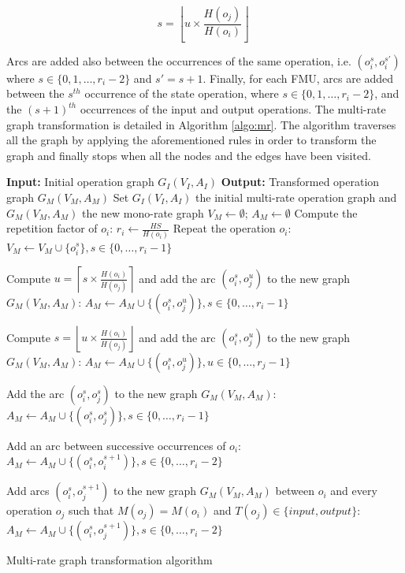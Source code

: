 \begin{equation}
s = \left \lfloor{u \times \frac{H(o_j)}{H(o_i)}}\right \rfloor\;
\end{equation}

Arcs are added also between the occurrences of the same operation, i.e. $(o_i^s,o_i^{s'})$ where $s \in \{0,1, \dots ,r_i-2\}$ and $s' = s + 1$. Finally, for each FMU, arcs are added between the $s^{th}$ occurrence of the state operation, where $s \in \{0,1, \dots ,r_i-2\}$, and the $(s+1)^{th}$ occurrences of the input and output operations. The multi-rate graph transformation is detailed in Algorithm \ref{algo:mr}. The algorithm traverses all the graph by applying the aforementioned rules in order to transform the graph and finally stops when all the nodes and the edges have been visited.

\begin{algorithm}[htb]
		\textbf{Input:} Initial operation graph $G_I(V_I,A_I)$\; 
		\textbf{Output:} Transformed operation graph $G_M(V_M,A_M)$\;
		Set $G_I(V_I,A_I)$ the initial multi-rate operation graph and $G_M(V_M,A_M)$ the new mono-rate graph\; 
		$V_M \leftarrow \emptyset$; $A_M \leftarrow \emptyset$\;
		{
			Compute the repetition factor of $o_i$: $r_i \leftarrow \frac{HS}{H(o_i)}$\;
			Repeat the operation $o_i$: $V_M \leftarrow V_M \cup \{o_i^s\}, s \in \{0, \dots,r_i-1\}$\;
		}
		{
			{
					Compute $u = \left \lceil{s \times \frac{H(o_i)}{H(o_j)}}\right \rceil$ and add the arc $(o_i^s,o_j^u)$ to the new graph $G_M(V_M,A_M)$: $A_M \leftarrow A_M \cup \{(o_i^s,o_j^u)\}, s \in \{0, \dots,r_i-1\}$\;
				
			}
			{
				
					Compute $s = \left \lfloor{u \times \frac{H(o_i)}{H(o_j)}}\right \rfloor$ and add the arc $(o_i^s,o_j^u)$ to the new graph $G_M(V_M,A_M)$: $A_M \leftarrow A_M \cup \{(o_i^s,o_j^u)\}, u \in \{0, \dots,r_j-1\}$\;
				
			}
			\Else
			{
				
					Add the arc $(o_i^s,o_j^s)$ to the new graph $G_M(V_M,A_M)$: $A_M \leftarrow A_M \cup \{(o_i^s,o_j^s)\}, s \in \{0, \dots,r_i-1\}$\;
				
			}
		}
		{
			
				Add an arc between successive occurrences of $o_i$: $A_M \leftarrow A_M \cup \{(o_i^s,o_i^{s+1})\}, s \in \{0, \dots,r_i-2\}$\;
			
		}
		{
					Add arcs $(o_i^s,o_j^{s+1})$ to the new graph $G_M(V_M,A_M)$ between $o_i$ and every operation $o_j$ such that $M(o_j)=M(o_i)$ and $T(o_j) \in \{input,output\}$: $A_M \leftarrow A_M \cup \{(o_i^s,o_j^{s+1})\}, s \in \{0, \dots,r_i-2\}$\;
				
		}
	\caption{Multi-rate graph transformation algorithm}
	\label{algo:mr}
\end{algorithm}

